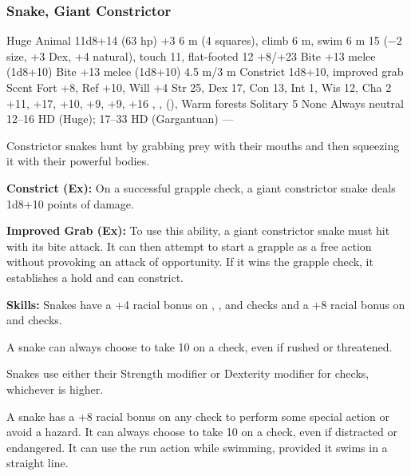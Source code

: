 \subsubsection{Snake, Giant Constrictor}
\begin{MonsterStats}
{Huge Animal}
{11d8+14 (63 hp)}
{+3}
{6 m (4 squares), climb 6 m, swim 6 m}
{15 ($-2$ size, +3 Dex, +4 natural), touch 11, flat-footed 12}
{+8/+23}
{Bite +13 melee (1d8+10)}
{Bite +13 melee (1d8+10)}
{4.5 m/3 m}
{Constrict 1d8+10, improved grab}
{Scent}
{Fort +8, Ref +10, Will +4}
{Str 25, Dex 17, Con 13, Int 1, Wis 12, Cha 2}
{ +11,  +17,  +10,  +9,  +9,  +16}
{, ,  (), }
{Warm forests}
{Solitary}
{5}
{None}
{Always neutral}
{12--16 HD (Huge); 17--33 HD (Gargantuan)}
{---}
\end{MonsterStats}


Constrictor snakes hunt by grabbing prey with their mouths and then squeezing it with their powerful bodies.

\textbf{Constrict (Ex):} On a successful grapple check, a giant constrictor snake deals 1d8+10 points of damage.

\textbf{Improved Grab (Ex):} To use this ability, a giant constrictor snake must hit with its bite attack. It can then attempt to start a grapple as a free action without provoking an attack of opportunity. If it wins the grapple check, it establishes a hold and can constrict.

\textbf{Skills:} Snakes have a +4 racial bonus on , , and  checks and a +8 racial bonus on  and  checks.

A snake can always choose to take 10 on a  check, even if rushed or threatened.

Snakes use either their Strength modifier or Dexterity modifier for  checks, whichever is higher.

A snake has a +8 racial bonus on any  check to perform some special action or avoid a hazard. It can always choose to take 10 on a  check, even if distracted or endangered. It can use the run action while swimming, provided it swims in a straight line.
